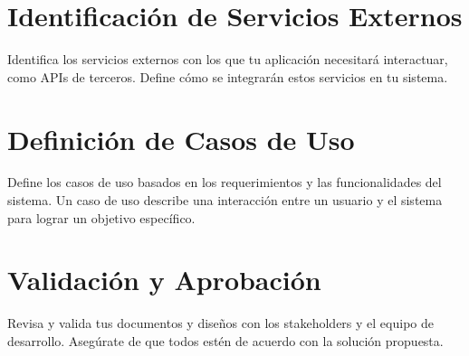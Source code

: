\documentclass[a4paper]{article}
\begin{document}
\section{Identificación de Servicios Externos}
Identifica los servicios externos con los que tu aplicación necesitará interactuar, como APIs de terceros. Define cómo se integrarán estos servicios en tu sistema.

\section{Definición de Casos de Uso}
Define los casos de uso basados en los requerimientos y las funcionalidades del sistema. Un caso de uso describe una interacción entre un usuario y el sistema para lograr un objetivo específico.

\section{Validación y Aprobación}
Revisa y valida tus documentos y diseños con los stakeholders y el equipo de desarrollo. Asegúrate de que todos estén de acuerdo con la solución propuesta.
\end{document}
